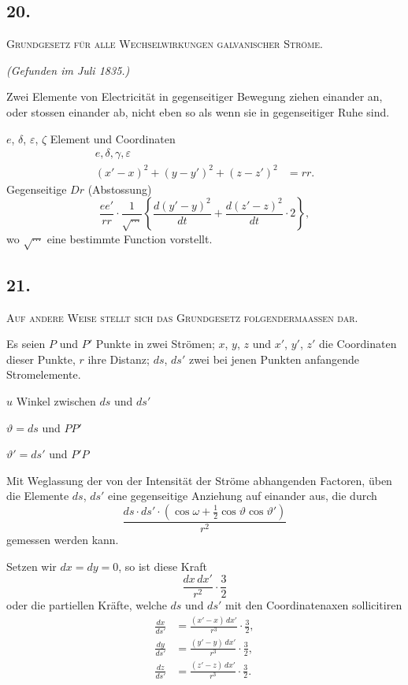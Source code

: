 \documentclass[fontsize=10pt,paper=a5,pagesize=auto]{scrbook}
\newcommand{\origpage}[1]{\marginpar{\footnotesize\textit{S. #1}}}
\begin{document}
\subsection*{20.}
\origpage{619}
\textsc{Grundgesetz für alle Wechselwirkungen galvanischer Ströme.}
\begin{otherlanguage}{ngerman}
\textit{(Gefunden im Juli 1835.)}
\end{otherlanguage}

Zwei Elemente von Electricität in gegenseitiger Bewegung ziehen einander an, oder stossen einander ab, nicht eben so als wenn sie in gegenseitiger Ruhe sind.

\origpage{620}
$e$, $\delta$, $\varepsilon$, $\zeta$ Element und Coordinaten
\begin{align*}
e, \delta, \gamma, \varepsilon&\\
(x' - x)^2 + (y - y')^2 + (z - z')^2 &= rr.
\end{align*}
Gegenseitige $Dr$ (Abstossung)
\[
\frac{ee'}{rr} \cdot \frac{1}{\sqrt{\cdots}} \left\{ \frac{d(y' - y)^2}{dt} + \frac{d(z' - z)^2}{dt} \cdot 2 \right\},
\]
wo $\sqrt{\cdots}$ eine bestimmte Function vorstellt.

\subsection*{21.}
\origpage{620}
\textsc{Auf andere Weise stellt sich das Grundgesetz folgendermaassen dar.}

Es seien $P$ und $P'$ Punkte in zwei Strömen; $x$, $y$, $z$ und $x'$, $y'$, $z'$ die Coordinaten dieser Punkte, $r$ ihre Distanz; $ds$, $ds'$ zwei bei jenen Punkten anfangende Stromelemente.

$u$ Winkel zwischen $ds$ und $ds'$

$\vartheta = ds$ und $PP'$

$\vartheta' = ds'$ und $P'P$

Mit Weglassung der von der Intensität der Ströme abhangenden Factoren, üben die Elemente $ds$, $ds'$ eine gegenseitige Anziehung auf einander aus, die durch
\[
\frac{ds \cdot ds' \cdot (\cos\omega + \tfrac{1}{2} \cos\vartheta \cos\vartheta')}{r^2}
\]
gemessen werden kann.

Setzen wir $dx = dy = 0$, so ist diese Kraft
\[
\frac{dx \, dx'}{r^2} \cdot \frac{3}{2}
\]
oder die partiellen Kräfte, welche $ds$ und $ds'$ mit den Coordinatenaxen sollicitiren
\begin{align*}
\frac{dx}{ds'} &= \frac{(x' - x) \, dx'}{r^3} \cdot \frac{3}{2},\\
\frac{dy}{ds'} &= \frac{(y' - y) \, dx'}{r^3} \cdot \frac{3}{2},\\
\frac{dz}{ds'} &= \frac{(z' - z) \, dx'}{r^3} \cdot \frac{3}{2}.
\end{align*}
\end{document}
